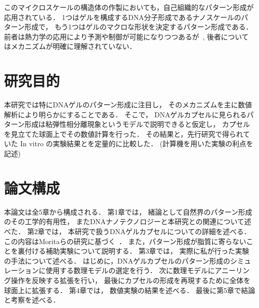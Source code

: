 このマイクロスケールの構造体の作製においても，自己組織的なパターン形成が応用されている．
1つはゲルを構成するDNA分子形成であるナノスケールのパターン形成で，
もう1つはゲルのマクロな形状を決定するパターン形成である．
前者は熱力学の応用により予測や制御が可能になりつつあるが~\cite{zadeh2011nupack}, 
後者についてはメカニズムが明確に理解されていない．


\section{研究目的}
本研究では特にDNAゲルのパターン形成に注目し，
そのメカニズムを主に数値解析により明らかにすることである．
そこで，
DNAゲルカプセルに見られるパターン形成は粘弾性相分離現象というモデルで説明できると仮定し，
カプセルを見立てた球面上でその数値計算を行った．
その結果と，先行研究で得られていた In vitro の実験結果とを定量的に比較した．
(計算機を用いた実験の利点を記述) %

\section{論文構成}
本論文は全5章から構成される．
第1章では，
緒論として自然界のパターン形成のその工学的有用性，
またDNAナノテクノロジーと本研究との関連について述べた．
第2章では，
本研究で扱うDNAゲルカプセルについての詳細を述べる．
この内容はMoritaらの研究に基づく~\cite{morita2017formation}．
また，パターン形成が脂質に寄らないことを裏付ける補助実験について説明する．
第3章では，
実際に私が行った実験の手法について述べる．
はじめに，DNAゲルカプセルのパターン形成のシミュレーションに使用する数理モデルの選定を行う．
次に数理モデルにアニーリング操作を反映する拡張を行い，
最後にカプセルの形成を再現するために全体を球面上に拡張する．
第4章では，
数値実験の結果を述べる．
最後に第5章で結論と考察を述べる．
